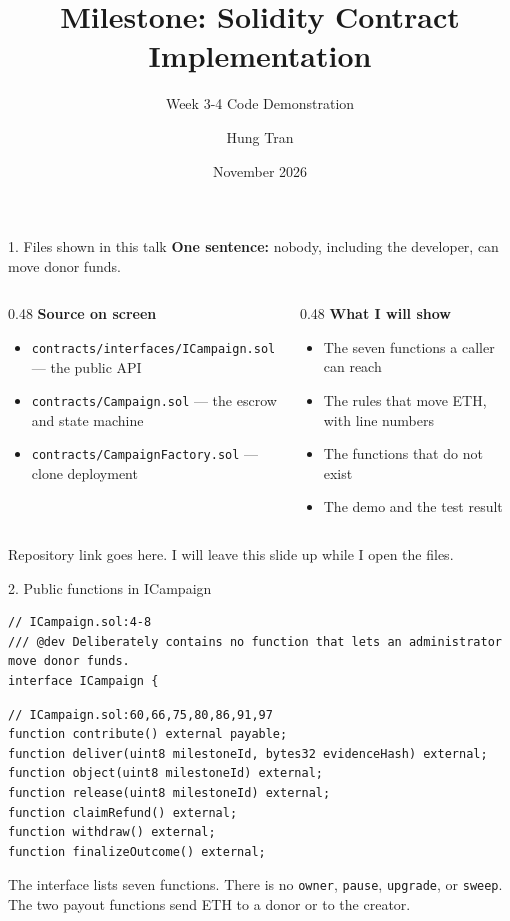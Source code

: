 \documentclass[aspectratio=169,10pt]{beamer}
\title{Milestone: Solidity Contract Implementation}
\subtitle{Week 3-4 Code Demonstration}
\author{Hung Tran}
\institute{Vietnamese-German University}
\date{November 2026}
\begin{document}
\begin{frame}{1. Files shown in this talk}
\textbf{One sentence:} nobody, including the developer, can move donor funds.

\vspace{0.4em}
\begin{columns}[T,onlytextwidth]
  \begin{column}{0.48\textwidth}
    \small\textbf{Source on screen}
    \begin{itemize}
      \item \texttt{contracts/interfaces/ICampaign.sol} — the public API
      \item \texttt{contracts/Campaign.sol} — the escrow and state machine
      \item \texttt{contracts/CampaignFactory.sol} — clone deployment
    \end{itemize}
  \end{column}
  \begin{column}{0.48\textwidth}
    \small\textbf{What I will show}
    \begin{itemize}
      \item The seven functions a caller can reach
      \item The rules that move ETH, with line numbers
      \item The functions that do not exist
      \item The demo and the test result
    \end{itemize}
  \end{column}
\end{columns}

\vspace{0.4em}
\small Repository link goes here. I will leave this slide up while I open the files.
\end{frame}

\begin{frame}[fragile]{2. Public functions in ICampaign}
\footnotesize
\begin{verbatim}
// ICampaign.sol:4-8
/// @dev Deliberately contains no function that lets an administrator move donor funds.
interface ICampaign {
\end{verbatim}
\vspace{0.2em}
\begin{verbatim}
// ICampaign.sol:60,66,75,80,86,91,97
function contribute() external payable;
function deliver(uint8 milestoneId, bytes32 evidenceHash) external;
function object(uint8 milestoneId) external;
function release(uint8 milestoneId) external;
function claimRefund() external;
function withdraw() external;
function finalizeOutcome() external;
\end{verbatim}
\vspace{0.3em}
\small The interface lists seven functions. There is no \texttt{owner}, \texttt{pause}, \texttt{upgrade}, or \texttt{sweep}.
The two payout functions send ETH to a donor or to the creator.
\end{frame}
\end{document}
